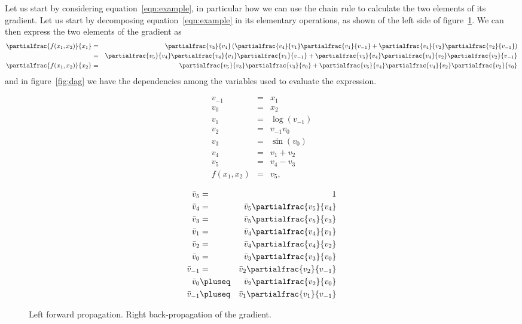 \documentclass{article}
\begin{document}
Let us start by considering equation~\ref{eqn:example}, in particular how we can
use the chain rule to calculate the two elements of its gradient. Let us start
by decomposing equation~\ref{eqn:example} in its elementary operations, as
shown of the left side of figure~\ref{fig:example}. We can then express the two
elements of the gradient as
\begin{eqnarray*}
\partialfrac{f(x_1,x_2)}{x_1}
&=& \partialfrac{v_5}{v_4}\left(\partialfrac{v_4}{v_1}\partialfrac{v_1}{v_{-1}}
	+ \partialfrac{v_4}{v_2}\partialfrac{v_2}{v_{-1}}\right) \\
&=& \partialfrac{v_5}{v_4}\partialfrac{v_4}{v_1}\partialfrac{v_1}{v_{-1}}
	+ \partialfrac{v_5}{v_4}\partialfrac{v_4}{v_2}\partialfrac{v_2}{v_{-1}} \\
\partialfrac{f(x_1,x_2)}{x_2}
&=& \partialfrac{v_5}{v_3}\partialfrac{v_3}{v_0}
	+ \partialfrac{v_5}{v_4}\partialfrac{v_4}{v_2}\partialfrac{v_2}{v_0}
\end{eqnarray*}
and in figure~\ref{fig:dag} we have the dependencies among the variables used
to evaluate the expression.

\begin{figure}
\begin{minipage}{.5\textwidth}
\begin{eqnarray*}
v_{-1} &=& x_1 \\
v_0 &=& x_2 \\
v_1 &=& \log(v_{-1}) \\
v_2 &=& v_{-1}v_0 \\
v_3 &=& \sin(v_0) \\
v_4 &=& v_1+v_2 \\
v_5 &=& v_4-v_3 \\
f(x_1,x_2) &=& v_5,
\end{eqnarray*}
\end{minipage}
\begin{minipage}{.5\textwidth}
\makepartialfractextstyle
\begin{eqnarray*}
\bar v_5 &=& 1 \\
\bar v_4 &=& \bar v_5 \partialfrac{v_5}{v_4} \\
\bar v_3 &=& \bar v_5 \partialfrac{v_5}{v_3} \\
\bar v_1 &=& \bar v_4 \partialfrac{v_4}{v_1} \\
\bar v_2 &=& \bar v_4 \partialfrac{v_4}{v_2} \\
\bar v_0 &=& \bar v_3 \partialfrac{v_3}{v_0} \\
\bar v_{-1} &=& \bar v_2 \partialfrac{v_2}{v_{-1}} \\
\bar v_0 &\pluseq& \bar v_2 \partialfrac{v_2}{v_0} \\
\bar v_{-1} &\pluseq& \bar v_1 \partialfrac{v_1}{v_{-1}}
\end{eqnarray*}
\end{minipage}
\label{fig:example}
\caption{Left forward propagation. Right back-propagation of the gradient.}
\end{figure}
\end{document}
